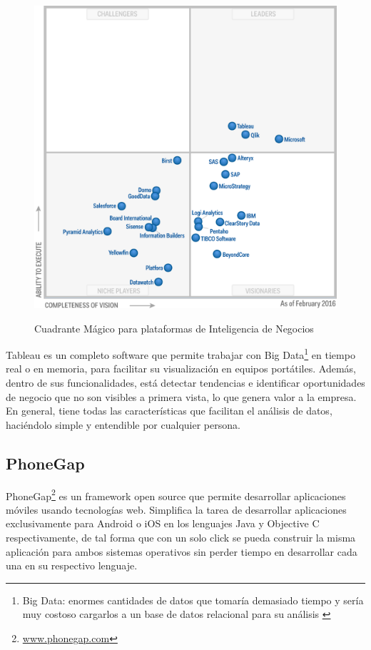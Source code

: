 \documentclass[letter,12pt,oneside]{report}
\begin{document}
\begin{figure}[H]
\begin{center}
\includegraphics[scale=0.7]{images/gartner.PNG}
\caption{Cuadrante Mágico para plataformas de Inteligencia de Negocios}
\label{gartner}
\end{center}
\end{figure}
Tableau es un completo software que permite trabajar con Big Data\footnote{Big Data: enormes cantidades de datos que tomaría demasiado tiempo y sería muy costoso cargarlos a un base de datos relacional para su análisis \cite{bigdata}} en tiempo real o en memoria, para facilitar su visualización en equipos portátiles. Además, dentro de sus funcionalidades, está detectar tendencias e identificar oportunidades de negocio que no son visibles a primera vista, lo que genera valor a la empresa. En general, tiene todas las características que facilitan el análisis de datos, haciéndolo simple y entendible por cualquier persona.

\subsection{PhoneGap}
PhoneGap\footnote{\url{www.phonegap.com}} es un framework open source que permite desarrollar aplicaciones móviles usando tecnologías web. Simplifica la tarea de desarrollar aplicaciones exclusivamente para Android o iOS en los lenguajes Java y Objective C respectivamente, de tal forma que con un solo click se pueda construir la misma aplicación para ambos sistemas operativos sin perder tiempo en desarrollar cada una en su respectivo lenguaje.
\end{document}
